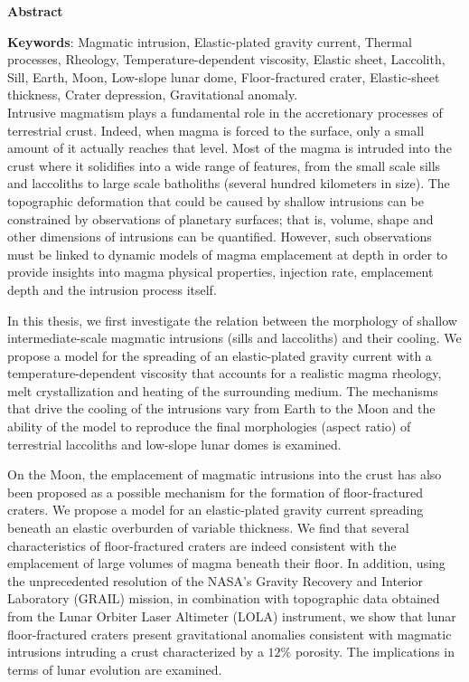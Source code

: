 \thispagestyle{fancy}
\begin{center}
    \Large
    \textbf{Abstract}
\end{center}

\textbf{Keywords}: Magmatic intrusion, Elastic-plated gravity
current, Thermal processes, Rheology, Temperature-dependent viscosity,
Elastic sheet, Laccolith, Sill, Earth, Moon, Low-slope lunar dome,
Floor-fractured crater, Elastic-sheet thickness, Crater depression,
Gravitational anomaly.\\

Intrusive  magmatism  plays a  fundamental  role  in the  accretionary
processes of terrestrial  crust.  Indeed, when magma is  forced to the
surface, only a small amount of  it actually reaches that level.  Most
of the  magma is intruded  into the crust  where it solidifies  into a
wide range of  features, from the small scale sills  and laccoliths to
large  scale  batholiths (several  hundred  kilometers  in size).  The
topographic deformation that could be caused by shallow intrusions can
be constrained by observations of planetary surfaces; that is, volume,
shape and other dimensions of intrusions can be quantified.  However,
such  observations  must be  linked  to  dynamic  models of  magma
emplacement at depth in order  to provide insights into magma physical
properties,  injection  rate,  emplacement  depth  and  the  intrusion
process itself.

In  this  thesis,  we  first  investigate  the  relation  between  the
morphology  of shallow  intermediate-scale magmatic  intrusions (sills
and  laccoliths)  and their  cooling.   We  propose  a model  for  the
spreading   of    an   elastic-plated    gravity   current    with   a
temperature-dependent viscosity  that accounts  for a  realistic magma
rheology, melt crystallization and  heating of the surrounding medium.
The  mechanisms that  drive the  cooling of  the intrusions  vary from
Earth to the Moon and the ability  of the model to reproduce the final
morphologies (aspect  ratio) of  terrestrial laccoliths  and low-slope
lunar domes is examined.

On the Moon, the emplacement of magmatic intrusions into the crust has
also  been proposed  as  a  possible mechanism  for  the formation  of
floor-fractured  craters.  We  propose a  model for  an elastic-plated
gravity current  spreading beneath  an elastic overburden  of variable
thickness.  We  find that  several characteristics  of floor-fractured
craters are indeed consistent with the emplacement of large volumes of
magma  beneath  their floor.   In  addition,  using the  unprecedented
resolution  of the  NASA's  Gravity Recovery  and Interior  Laboratory
(GRAIL) mission,  in combination  with topographic data  obtained from
the  Lunar Orbiter  Laser Altimeter  (LOLA) instrument,  we show  that
lunar   floor-fractured   craters  present   gravitational   anomalies
consistent with magmatic intrusions intruding a crust characterized by
a $12\%$  porosity. The implications  in terms of lunar  evolution are
examined.

